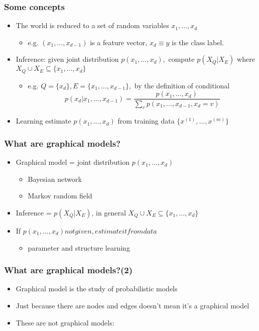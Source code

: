 \documentclass[slidestop,compress,mathserif]{beamer}
\begin{document}
	\begin{frame}
		\frametitle{Some concepts}
		\begin{itemize}
			\item The world is reduced to a set of random variables $x_1,\ldots,x_d$
			\begin{itemize}
				\item e.g. $(x_1,\ldots,x_{d-1}) $ is a feature vector, $x_d\equiv y$ is the class label.
			\end{itemize}
			\item Inference: given joint distribution $p(x_1,\ldots,x_d),$ compute $p(X_Q|X_E)$ where $X_Q\cup X_E \subseteq \{x_1,\ldots,x_d\}$
			\begin{itemize}
				\item e.g. $Q=\{x_d\},E=\{x_1,\ldots,x_{d-1}\},$ by the definition of conditional
				$$p(x_d|x_1,\ldots,x_{d-1})=\frac{p(x_1,\ldots,x_d)}{\sum_vp(x_1,\ldots,x_{d-1},x_d=v)}$$
			\end{itemize}
			\item Learning estimate $p(x_1,\ldots,x_d)$ from training data $\{x^{(1)},\ldots,x^{(m)}\}$
		\end{itemize}
	\end{frame}
	\begin{frame}
		\frametitle{What are graphical models?}
		\begin{itemize}
			\item Graphical model = joint distribution $p(x_1,\ldots,x_d)$
			\begin{itemize}
				\item Bayesian network
				\item Markov random field
			\end{itemize}
			\item Inference = $p(X_Q|X_E)$, in general $X_Q\cup X_E \subseteq \{x_1,\ldots,x_d\}$
			\item If $p(x_1,\ldots,x_d) not given, estimate it from data$
			\begin{itemize}
				\item parameter and structure learning
			\end{itemize}
		\end{itemize}
	\end{frame}
	\begin{frame}
		\frametitle{What are graphical models?(2)}
		\begin{itemize}
			\item Graphical model is the study of probabilistic models
			\item Just because there are nodes and edges doesn't mean it's a graphical model
			\item These are not graphical models:
			\begin{figure}
				
				
			\end{figure}
		\end{itemize}
	\end{frame}
\end{document}
